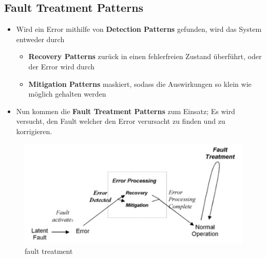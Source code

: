 \subsection{Fault Treatment Patterns}


\begin{itemize}
	\item Wird ein Error mithilfe von \textbf{Detection Patterns} gefunden, wird das System entweder durch
	\begin{itemize}
		\item \textbf{Recovery Patterns} zurück in einen fehlerfreien Zustand überführt, oder der Error wird durch
		\item \textbf{Mitigation Patterns} maskiert, sodass die Auswirkungen so klein wie möglich gehalten werden
	\end{itemize}
	\item Nun kommen die \textbf{Fault Treatment Patterns} zum Einsatz; Es wird versucht, den Fault welcher den Error verursacht zu finden und zu korrigieren.
\end{itemize}



\begin{figure}[H]
	\centering
	\includegraphics[width=\textwidth]{content/faulttolerance/images/fault_treatment.png}
	\caption{fault treatment}
\end{figure}




